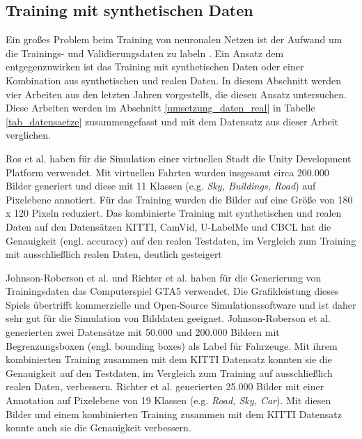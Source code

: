 \subsection{Training mit synthetischen Daten}
\label{grundlagen_nn_synthetisch}

Ein großes Problem beim Training von neuronalen Netzen ist der Aufwand um die Trainings- und Validierungsdaten zu labeln \cite{richter2016playing}. Ein Ansatz dem entgegenzuwirken ist das Training mit synthetischen Daten oder einer Kombination aus synthetischen und realen Daten. In diesem Abschnitt werden vier Arbeiten aus den letzten Jahren vorgestellt, die diesen Ansatz untersuchen. Diese Arbeiten werden im Abschnitt \ref{umsetzung_daten_real} in Tabelle \ref{tab_datensaetze} zusammengefasst und mit dem Datensatz aus dieser Arbeit verglichen.

Ros et al. \cite{ros2016synthia} haben für die Simulation einer virtuellen Stadt die Unity Development Platform verwendet. Mit virtuellen Fahrten wurden insgesamt circa 200.000 Bilder generiert und diese mit 11 Klassen (e.g. \textit{Sky, Buildings, Road}) auf Pixelebene annotiert. Für das Training wurden die Bilder auf eine Größe von 180 x 120 Pixeln reduziert. Das kombinierte Training mit synthetischen und realen Daten auf den Datensätzen KITTI, CamVid, U-LabelMe und CBCL hat die Genauigkeit (engl. accuracy) auf den realen Testdaten, im Vergleich zum Training mit ausschließlich realen Daten, deutlich gesteigert

Johnson-Roberson et al. \cite{johnson2017driving} und Richter et al. \cite{richter2016playing} haben für die Generierung von Trainingsdaten das Computerspiel GTA5 verwendet. Die Grafikleistung dieses Spiels übertrifft kommerzielle und Open-Source Simulationssoftware und ist daher sehr gut für die Simulation von Bilddaten geeignet. Johnson-Roberson et al. \cite{johnson2017driving} generierten zwei Datensätze mit 50.000 und 200.000 Bildern mit Begrenzungsboxen (engl. bounding boxes) als Label für Fahrzeuge. Mit ihrem kombinierten Training zusammen mit dem KITTI Datensatz konnten sie die Genauigkeit auf den Testdaten, im Vergleich zum Training auf ausschließlich realen Daten, verbessern. Richter et al. \cite{richter2016playing} generierten 25.000 Bilder mit einer Annotation auf Pixelebene von 19 Klassen (e.g. \textit{Road, Sky, Car}). Mit diesen Bilder und einem kombinierten Training zusammen mit dem KITTI Datensatz konnte auch sie die Genauigkeit verbessern.

